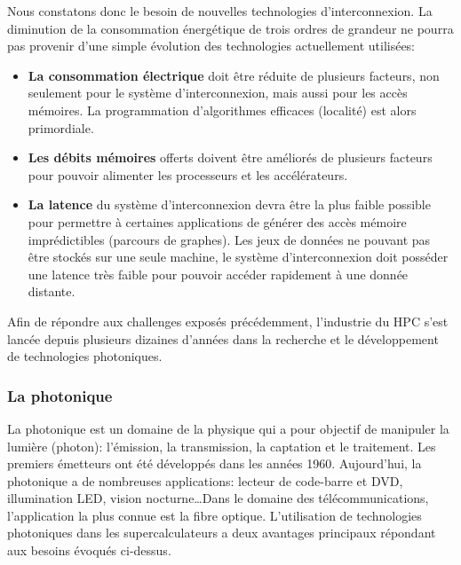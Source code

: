         Nous constatons donc le besoin de nouvelles technologies d'interconnexion. La diminution de la consommation énergétique de trois ordres de grandeur ne pourra pas provenir d'une simple évolution des technologies actuellement utilisées:
        \begin{itemize}
            \item \textbf{La consommation électrique} doit être réduite de plusieurs facteurs, non seulement pour le système d'interconnexion, mais aussi pour les accès mémoires. La programmation d'algorithmes efficaces (localité) est alors primordiale. 
            \item \textbf{Les débits mémoires} offerts doivent être améliorés de plusieurs facteurs pour pouvoir alimenter les processeurs et les accélérateurs. 
            \item \textbf{La latence} du système d'interconnexion devra être la plus faible possible pour permettre à certaines applications de générer des accès mémoire imprédictibles (parcours de graphes). Les jeux de données ne pouvant pas être stockés sur une seule machine, le système d'interconnexion doit posséder une latence très faible pour pouvoir accéder rapidement à une donnée distante.
        \end{itemize}
        Afin de répondre aux challenges exposés précédemment, l'industrie du HPC s'est lancée depuis plusieurs dizaines d'années dans la recherche et le développement de technologies photoniques. 
    
    
    \subsubsection{La photonique}
    
        La photonique est un domaine de la physique qui a pour objectif de manipuler la lumière (photon): l'émission, la transmission, la captation et le traitement. Les premiers émetteurs ont été développés dans les années 1960. Aujourd'hui, la photonique a de nombreuses applications: lecteur de code-barre et DVD, illumination LED, vision nocturne\ldots Dans le domaine des télécommunications, l'application la plus connue est la fibre optique. L'utilisation de technologies photoniques dans les supercalculateurs a deux avantages principaux répondant aux besoins évoqués ci-dessus.
       
